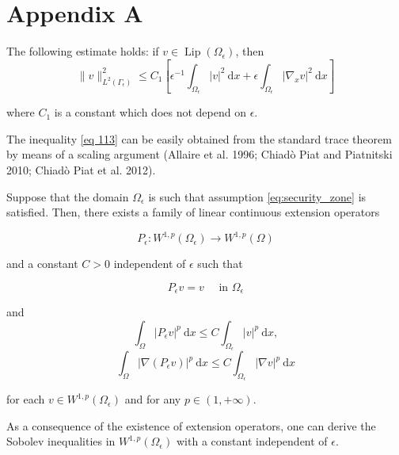 \section{Appendix A}
\begin{lemma} The following estimate holds: if $v \in \operatorname{Lip}\left(\Omega_{\epsilon}\right)$, then
\begin{equation}
  \|v\|_{L^{2}\left(\Gamma_{\epsilon}\right)}^{2} \leq C_{1}\left[\epsilon^{-1} \int_{\Omega_{\epsilon}}|v|^{2} \mathrm{~d} x+\epsilon \int_{\Omega_{\epsilon}}\left|\nabla_{x} v\right|^{2} \mathrm{~d} x\right]
\label{eq 113}\end{equation}


where $C_{1}$ is a constant which does not depend on $\epsilon$.
\label{lemma 7.1}\end{lemma}
The inequality \eqref{eq 113} can be easily obtained from the standard trace theorem by means of a scaling argument (Allaire et al. 1996; Chiadò Piat and Piatnitski 2010; Chiadò Piat et al. 2012).

\begin{lemma}
  
 Suppose that the domain $\Omega_{\epsilon}$ is such that assumption \eqref{eq:security_zone} is satisfied. Then, there exists a family of linear continuous extension operators

$$
P_{\epsilon}: W^{1, p}\left(\Omega_{\epsilon}\right) \rightarrow W^{1, p}(\Omega)
$$

and a constant $C>0$ independent of $\epsilon$ such that

$$
P_{\epsilon} v=v \quad \text { in } \Omega_{\epsilon}
$$

and
\begin{equation}
  \int_{\Omega}\left|P_{\epsilon} v\right|^{p} \mathrm{~d} x \leq C \int_{\Omega_{\epsilon}}|v|^{p} \mathrm{~d} x,
\label{eq 114}\end{equation}
\begin{equation}
  \int_{\Omega}\left|\nabla\left(P_{\epsilon} v\right)\right|^{p} \mathrm{~d} x \leq C \int_{\Omega_{\epsilon}}|\nabla v|^{p} \mathrm{~d} x
\label{eq 115}\end{equation}

for each $v \in W^{1, p}\left(\Omega_{\epsilon}\right)$ and for any $p \in(1,+\infty)$.
\label{lemma 7.2}\end{lemma}


As a consequence of the existence of extension operators, one can derive the Sobolev inequalities in $W^{1, p}\left(\Omega_{\epsilon}\right)$ with a constant independent of $\epsilon$.

